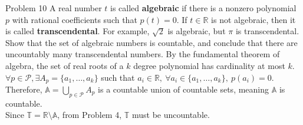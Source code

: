 \documentclass[10pt]{extarticle}
\begin{document}
  \begin{problem}{Problem 10}
    A real number $t$ is called \textbf{algebraic} if there is a nonzero polynomial $p$ with rational coefficients such that $p(t) = 0$. If $t\in \mathbb{R}$ is not algebraic, then it is called \textbf{transcendental}. For example, $\sqrt{2}$ is algebraic, but $\pi$ is transcendental. Show that the set of algebraic numbers is countable, and conclude that there are uncountably many transcendental numbers.
    \tcblower
    By the fundamental theorem of algebra, the set of real roots of a $k$ degree polynomial has cardinality at most $k$.\\

    $\forall p\in \mathcal{P},\exists A_p = \{a_1,\dots,a_k\}$ such that $a_i\in\mathbb{R},~\forall a_i\in \{a_1,\dots,a_k\},~p(a_i) = 0$. Therefore, $\mathbb{A} = \bigcup_{p\in\mathcal{P}}A_p$ is a countable union of countable sets, meaning $\mathbb{A}$ is countable.\\

    Since $\mathbb{T} = \mathbb{R} \setminus \mathbb{A}$, from Problem 4, $\mathbb{T}$ must be uncountable.
  \end{problem}
\end{document}
